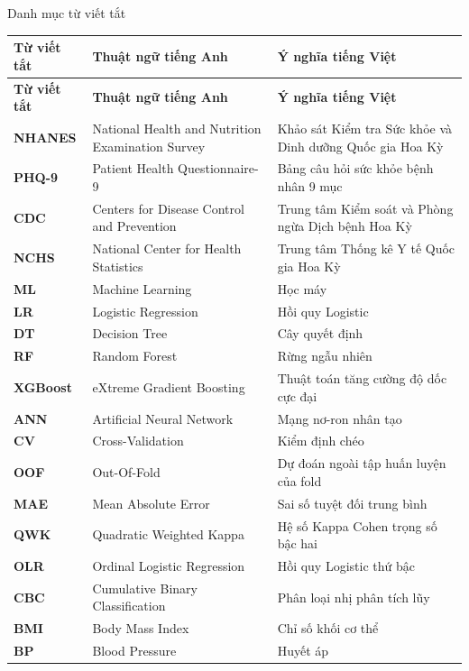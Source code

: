 \documentclass{uetgraduation}
\begin{document}
\begin{contentlisting}
\begin{contentlistingsection}{Danh mục từ viết tắt}
\setlength{\tabcolsep}{4pt}
\begin{longtable}{p{2.0cm} p{6.4cm} p{6.4cm}}
\toprule
\textbf{Từ viết tắt} & \textbf{Thuật ngữ tiếng Anh} & \textbf{Ý nghĩa tiếng Việt} \\
\midrule
\endfirsthead
\toprule
\textbf{Từ viết tắt} & \textbf{Thuật ngữ tiếng Anh} & \textbf{Ý nghĩa tiếng Việt} \\
\midrule
\endhead
\bottomrule
\endfoot
\textbf{NHANES} & National Health and Nutrition Examination Survey & Khảo sát Kiểm tra Sức khỏe và Dinh dưỡng Quốc gia Hoa Kỳ \\
\textbf{PHQ-9}  & Patient Health Questionnaire-9 & Bảng câu hỏi sức khỏe bệnh nhân 9 mục \\
\textbf{CDC}    & Centers for Disease Control and Prevention & Trung tâm Kiểm soát và Phòng ngừa Dịch bệnh Hoa Kỳ \\
\textbf{NCHS}   & National Center for Health Statistics & Trung tâm Thống kê Y tế Quốc gia Hoa Kỳ \\
\textbf{ML}     & Machine Learning & Học máy \\
\textbf{LR}     & Logistic Regression & Hồi quy Logistic \\
\textbf{DT}     & Decision Tree & Cây quyết định \\
\textbf{RF}     & Random Forest & Rừng ngẫu nhiên \\
\textbf{XGBoost}& eXtreme Gradient Boosting & Thuật toán tăng cường độ dốc cực đại \\
\textbf{ANN}    & Artificial Neural Network & Mạng nơ-ron nhân tạo \\
\textbf{CV}     & Cross-Validation & Kiểm định chéo \\
\textbf{OOF}    & Out-Of-Fold & Dự đoán ngoài tập huấn luyện của fold \\
\textbf{MAE}    & Mean Absolute Error & Sai số tuyệt đối trung bình \\
\textbf{QWK}    & Quadratic Weighted Kappa & Hệ số Kappa Cohen trọng số bậc hai \\
\textbf{OLR}    & Ordinal Logistic Regression & Hồi quy Logistic thứ bậc \\
\textbf{CBC}    & Cumulative Binary Classification & Phân loại nhị phân tích lũy \\
\textbf{BMI}    & Body Mass Index & Chỉ số khối cơ thể \\
\textbf{BP}     & Blood Pressure & Huyết áp \\

\end{longtable}
\end{contentlistingsection}
\end{contentlisting}
\end{document}
